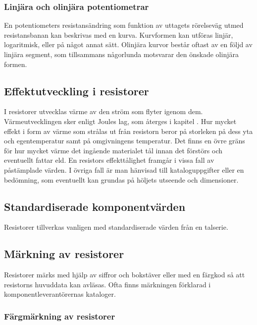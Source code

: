 \subsubsection{Linjära och olinjära potentiometrar}

En potentiometers resistansändring som funktion av uttagets rörelseväg utmed
resistansbanan kan beskrivas med en kurva.
Kurvformen kan utföras linjär, logaritmisk, eller på något annat sätt.
Olinjära kurvor består oftast av en följd av linjära segment, som tillsammans
någorlunda motsvarar den önskade olinjära formen.

\subsection{Effektutveckling i resistorer}

I resistorer utvecklas värme av den ström som flyter igenom dem.
Värmeutvecklingen sker enligt Joules lag, som återges i kapitel .
Hur mycket effekt i form av värme som strålas ut från resistorn beror på
storleken på dess yta och egentemperatur samt på omgivningens temperatur.
Det finns en övre gräns för hur mycket värme det ingående materialet tål innan
det förstörs och eventuellt fattar eld.
En resistors effekttålighet framgår i vissa fall av påstämplade värden.
I övriga fall är man hänvisad till kataloguppgifter eller en bedömning, som
eventuellt kan grundas på höljets utseende och dimensioner.

\subsection{Standardiserade komponentvärden}

Resistorer tillverkas vanligen med standardiserade värden från en talserie.

\subsection{Märkning av resistorer}
\label{färgmärkning}

Resistorer märks med hjälp av siffror och bokstäver eller med en färgkod så att
resistorns huvuddata kan avläsas.
Ofta finns märkningen förklarad i komponentleverantörernas kataloger.

\subsubsection{Färgmärkning av resistorer}

